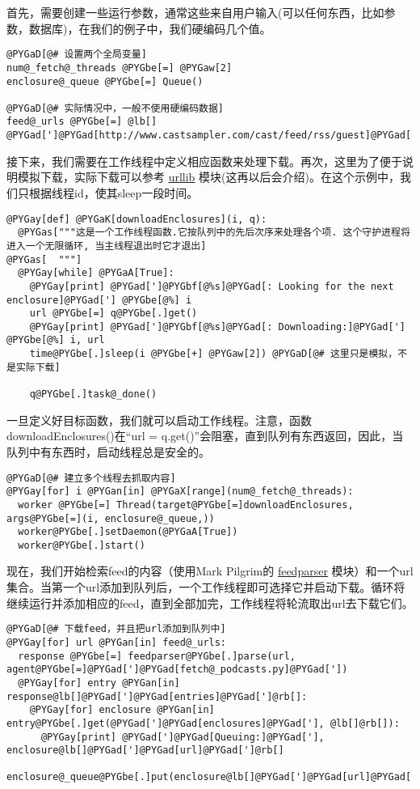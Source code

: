 \documentclass[a4paper,10pt,english]{manual}
\begin{document}
首先，需要创建一些运行参数，通常这些来自用户输入(可以任何东西，比如参数，数据库)，在我们的例子中，我们硬编码几个值。

\begin{Verbatim}[commandchars=@\[\]]
@PYGaD[@# 设置两个全局变量]
num@_fetch@_threads @PYGbe[=] @PYGaw[2]
enclosure@_queue @PYGbe[=] Queue()

@PYGaD[@# 实际情况中，一般不使用硬编码数据]
feed@_urls @PYGbe[=] @lb[] @PYGad[']@PYGad[http://www.castsampler.com/cast/feed/rss/guest]@PYGad['],@rb[]
\end{Verbatim}

接下来，我们需要在工作线程中定义相应函数来处理下载。再次，这里为了便于说明模拟下载，实际下载可以参考 \href{http://docs.python.org/lib/module-urllib.html}{urllib} 模块(这再以后会介绍)。在这个示例中，我们只根据线程id，使其sleep一段时间。

\begin{Verbatim}[commandchars=@\[\]]
@PYGay[def] @PYGaK[downloadEnclosures](i, q):
  @PYGas["""这是一个工作线程函数.它按队列中的先后次序来处理各个项. 这个守护进程将进入一个无限循环, 当主线程退出时它才退出]
@PYGas[  """]
  @PYGay[while] @PYGaA[True]:
    @PYGay[print] @PYGad[']@PYGbf[@%s]@PYGad[: Looking for the next enclosure]@PYGad['] @PYGbe[@%] i
    url @PYGbe[=] q@PYGbe[.]get()
    @PYGay[print] @PYGad[']@PYGbf[@%s]@PYGad[: Downloading:]@PYGad['] @PYGbe[@%] i, url
    time@PYGbe[.]sleep(i @PYGbe[+] @PYGaw[2]) @PYGaD[@# 这里只是模拟，不是实际下载]

    q@PYGbe[.]task@_done()
\end{Verbatim}

一旦定义好目标函数，我们就可以启动工作线程。注意，函数downloadEnclosures()在“url = q.get()”会阻塞，直到队列有东西返回，因此，当队列中有东西时，启动线程总是安全的。

\begin{Verbatim}[commandchars=@\[\]]
@PYGaD[@# 建立多个线程去抓取内容]
@PYGay[for] i @PYGan[in] @PYGaX[range](num@_fetch@_threads):
  worker @PYGbe[=] Thread(target@PYGbe[=]downloadEnclosures, args@PYGbe[=](i, enclosure@_queue,))
  worker@PYGbe[.]setDaemon(@PYGaA[True])
  worker@PYGbe[.]start()
\end{Verbatim}

现在，我们开始检索feed的内容（使用Mark Pilgrim的 \href{http://www.feedparser.org/}{feedparser} 模块）和一个url集合。当第一个url添加到队列后，一个工作线程即可选择它并启动下载。循环将继续运行并添加相应的feed，直到全部加完，工作线程将轮流取出url去下载它们。

\begin{Verbatim}[commandchars=@\[\]]
@PYGaD[@# 下载feed，并且把url添加到队列中]
@PYGay[for] url @PYGan[in] feed@_urls:
  response @PYGbe[=] feedparser@PYGbe[.]parse(url, agent@PYGbe[=]@PYGad[']@PYGad[fetch@_podcasts.py]@PYGad['])
  @PYGay[for] entry @PYGan[in] response@lb[]@PYGad[']@PYGad[entries]@PYGad[']@rb[]:
    @PYGay[for] enclosure @PYGan[in] entry@PYGbe[.]get(@PYGad[']@PYGad[enclosures]@PYGad['], @lb[]@rb[]):
      @PYGay[print] @PYGad[']@PYGad[Queuing:]@PYGad['], enclosure@lb[]@PYGad[']@PYGad[url]@PYGad[']@rb[]
      enclosure@_queue@PYGbe[.]put(enclosure@lb[]@PYGad[']@PYGad[url]@PYGad[']@rb[])
\end{Verbatim}
\end{document}

